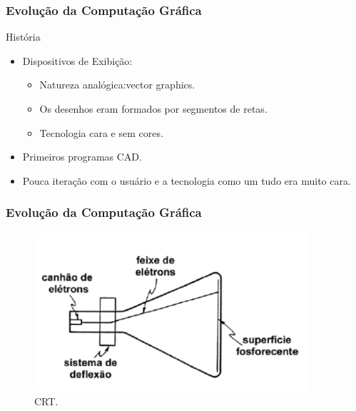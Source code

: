 \documentclass{beamer}
\begin{document}
\begin{frame}
\frametitle{Evolução da Computação Gráfica}

\begin{block}{História}

	\begin{itemize}
		\item<1-> Dispositivos de Exibição:
		\begin{itemize}
			\item<1-> Natureza analógica:vector graphics.
			\item<1-> Os desenhos eram formados por segmentos de retas.
			\item<1-> Tecnologia cara e sem cores.
		\end{itemize}
		\item<1-> Primeiros programas CAD.
		\item<1-> Pouca iteração com o usuário e a tecnologia como um tudo era muito cara.
	
	\end{itemize}
\end{block}

\end{frame}



\begin{frame}
\frametitle{Evolução da Computação Gráfica}

	\begin{figure}[!h]
		\begin{center}
			\includegraphics[width=0.9\textwidth]{Figures/crt}
			\caption{CRT.}
		\end{center}
		
	\end{figure}

\end{frame}
\end{document}
